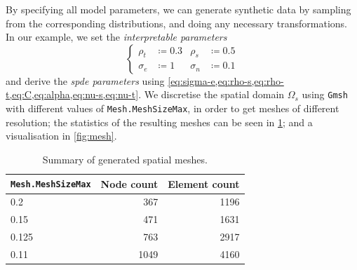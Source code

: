 \documentclass[british]{scrreprt}
\begin{document}
By specifying all model parameters, we can generate synthetic data by sampling from the corresponding distributions, and doing any necessary transformations. In our example, we set the \textit{interpretable parameters}
\begin{equation}
    \left\{
    \begin{aligned}
        \rho_{t}   &\coloneqq 0.3 &
        \rho_{s}   &\coloneqq 0.5 \\
        \sigma_{e} &\coloneqq 1   &
        \sigma_{n} &\coloneqq 0.1
    \end{aligned}
    \right.
\end{equation}
and derive the \textit{\gls{spde} parameters} using \cref{eq:sigma-e,eq:rho-s,eq:rho-t,eq:C,eq:alpha,eq:nu-s,eq:nu-t}. We discretise the spatial domain \( \Omega_{s} \) using \texttt{Gmsh}~\cite{GeuzaineGmsh3Dfinite2009} with different values of \texttt{Mesh.MeshSizeMax}, in order to get meshes of different resolution; the statistics of the resulting meshes can be seen in \cref{tab:spatial-mesh}; and a visualisation in \cref{fig:mesh}. %
\begin{table}
    \centering
    \begin{tabular}{l r r}
        \toprule
        \texttt{Mesh.MeshSizeMax} & Node count & Element count \\
        \midrule
        0.2   &  367 & 1196 \\
        0.15  &  471 & 1631 \\
        0.125 &  763 & 2917 \\
        0.11  & 1049 & 4160 \\
        \bottomrule
    \end{tabular}
    \caption{Summary of generated spatial meshes.}
    \label{tab:spatial-mesh}
\end{table}%
\end{document}
